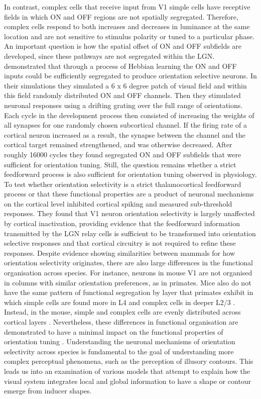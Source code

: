 \documentclass[12pt]{article}
\begin{document}
In contrast, complex cells that receive input from V1 simple cells have receptive fields in which ON and OFF regions are not spatially segregated. Therefore, complex cells respond to both increases and decreases in luminance at the same location and are not sensitive to stimulus polarity or tuned to a particular phase. An important question is how the spatial offset of ON and OFF subfields are developed, since these pathways are not segregated within the LGN. \textcite{nguyenModelOriginDevelopment2019} demonstrated that through a process of Hebbian learning the ON and OFF inputs could be sufficiently segregated to produce orientation selective neurons. In their simulations they simulated a 6 x 6 degree patch of visual field and within this field randomly distributed ON and OFF channels. Then they stimulated neuronal responses using a drifting grating over the full range of orientations. Each cycle in the development process then consisted of increasing the weights of all synapses for one randomly chosen subcortical channel. If the firing rate of a cortical neuron increased as a result, the synapse between the channel and the cortical target remained strengthened, and was otherwise decreased. After roughly 16000 cycles they found segregated ON and OFF subfields that were sufficient for orientation tuning. Still, the question remains whether a strict feedforward process is also sufficient for orientation tuning observed in physiology.
\bigbreak
To test whether orientation selectivity is a strict thalamocortical feedforward process or that these functional properties are a product of neuronal mechanisms on the cortical level \textcite{fersterOrientationSelectivityThalamic1996} inhibited cortical spiking and measured sub-threshold responses. They found that V1 neuron orientation selectivity is largely unaffected by cortical inactivation, providing evidence that the feedforward information transmitted by the LGN relay cells is sufficient to be transformed into orientation selective responses and that cortical circuitry is not required to refine these responses. Despite evidence showing similarities between mammals for how orientation selectivity originates, there are also large differences in the functional organisation across species. For instance, neurons in mouse V1 are not organised in columns with similar orientation preferences, as in primates. Mice also do not have the same pattern of functional segregation by layer that primates exhibit in which simple cells are found more in L4 and complex cells in deeper L2/3 \autocite{martinezReceptiveFieldStructure2005}. Instead, in the mouse, simple and complex cells are evenly distributed across cortical layers \autocite{niellHighlySelectiveReceptive2008}. Nevertheless, these differences in functional organisation are demonstrated to have a minimal impact on the functional properties of orientation tuning \autocite{hooserOrientationSelectivityOrientation2005}. Understanding the neuronal mechanisms of orientation selectivity across species is fundamental to the goal of understanding more complex perceptual phenomena, such as the perception of illusory contours. This leads us into an examination of various models that attempt to explain how the visual system integrates local and global information to have a shape or contour emerge from inducer shapes.    
\end{document}
